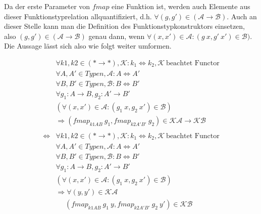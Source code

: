 Da der erste Parameter von $fmap$ eine Funktion ist, werden auch Elemente aus dieser Funktionstyprelation allquantifiziert, d.h.
$\forall (g, g') \in (\mathcal{A} \rightarrow \mathcal{B})$. Auch an dieser Stelle kann man die Definition des Funktionstypkonstruktors
einsetzen, also $(g, g') \in (\mathcal{A} \rightarrow \mathcal{B})$ genau dann, wenn $\forall (x, x') \in \mathcal{A}: (g\ x, g'\ x')
\in \mathcal{B})$. Die Aussage lässt sich also wie folgt weiter umformen.


\begin{align*}
&\forall k1, k2 \in (* \rightarrow *), \mathcal{K} : k_1 \Leftrightarrow k_2, \mathcal{K}~\text{beachtet Functor} \\
&\forall A, A' \in Typen, \mathcal{A} : A \Leftrightarrow A' \\
&\forall B, B' \in Typen, \mathcal{B} : B \Leftrightarrow B' \\
&\forall g_1 : A \rightarrow B, g_2 : A' \rightarrow B' \\
&(\forall (x, x') \in \mathcal{A}: (g_1\ x, g_2\ x') \in \mathcal{B})\\
&\Rightarrow (fmap_{k1 A B}\ g_1, fmap_{k2 A' B'}\ g_2) \in \mathcal{K} \mathcal{A} \rightarrow \mathcal{K} \mathcal{B} \\
&\\
\Leftrightarrow &\forall k1, k2 \in (* \rightarrow *), \mathcal{K} : k_1 \Leftrightarrow k_2, \mathcal{K}~\text{beachtet Functor} \\
&\forall A, A' \in Typen, \mathcal{A} : A \Leftrightarrow A' \\
&\forall B, B' \in Typen, \mathcal{B} : B \Leftrightarrow B' \\
&\forall g_1 : A \rightarrow B, g_2 : A' \rightarrow B' \\
&(\forall (x, x') \in \mathcal{A}: (g_1\ x, g_2\ x') \in \mathcal{B})\\
&\Rightarrow \forall (y, y') \in \mathcal{K} \mathcal{A} \\
&\ \ \ \ \ \ (fmap_{k1 A B}\ g_1\ y, fmap_{k2 A' B'}\ g_2\ y') \in \mathcal{K} \mathcal{B}\\
\end{align*}

